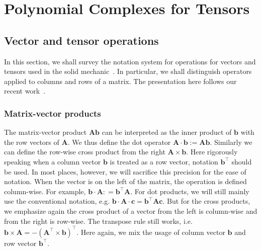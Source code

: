 \chapter{Polynomial Complexes for Tensors}



\section{Vector and tensor operations}
In this section, we shall survey the notation system for operations for vectors and tensors used in the solid mechanic~\cite{Kelly:Mechanics}. In particular, we shall distinguish operators applied to columns and rows of a matrix. The presentation here follows our recent work~\cite{Chen;Huang:2020Finite,Chen;Huang:2021Finite}. 

\subsection{Matrix-vector products}
The matrix-vector product $\boldsymbol A\boldsymbol b$ can be interpreted as the inner product of $\boldsymbol b$ with the row vectors of $\boldsymbol A$. We thus define the dot operator
$\boldsymbol A\cdot \boldsymbol b := \boldsymbol A \boldsymbol b.$ Similarly we can define the row-wise cross product from the right $\boldsymbol A\times \boldsymbol b$. 
Here rigorously speaking when a column vector $\boldsymbol b$ is treated as a row vector, notation $\boldsymbol b^{\intercal}$ should be used. In most places, however, we will sacrifice this precision for the ease of notation. When the vector is on the left of the matrix, the operation is defined column-wise. For example, $\boldsymbol b \cdot \boldsymbol A : = \boldsymbol b^{\intercal}\boldsymbol A$. For dot products, we will still mainly use the conventional notation, e.g. $\boldsymbol b\cdot \boldsymbol A\cdot \boldsymbol c = \boldsymbol b^{\intercal} \boldsymbol A\boldsymbol c$. But for the cross products, we emphasize again the cross product of a vector from the left is column-wise and from the right is row-wise. The transpose rule still works, i.e. $\boldsymbol b\times \boldsymbol A = -(\boldsymbol A^{\intercal}\times \boldsymbol b )^{\intercal}$. Here again, we mix the usage of column vector $\boldsymbol b$ and row vector $\boldsymbol b^{\intercal}$. 


